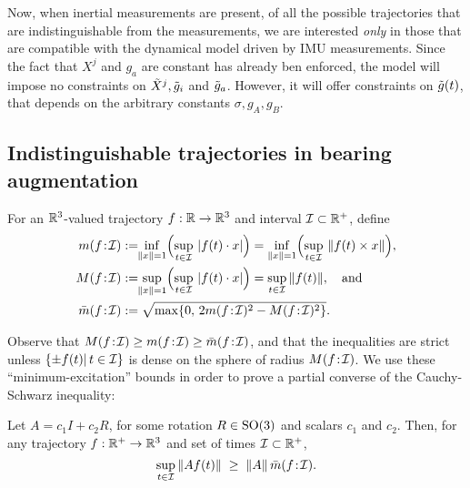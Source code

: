 Now, when inertial measurements are present, of all the possible trajectories that are indistinguishable from the measurements, we are interested {\em only} in those that are compatible with the dynamical model driven by IMU measurements. Since the fact that $X^j$ and $g_a$ are constant has already ben enforced, the model will impose no constraints on $\tilde{X}^j, \tilde{g}_i$ and $\tilde{g}_a$. However, it will offer constraints on $\tilde{g}(t)$, that depends on the arbitrary constants $\sigma, g_A, g_B$. 

\subsection{Indistinguishable trajectories in bearing augmentation}

\begin{defn}
For an $\mathbb{R}^3$-valued trajectory $f:\mathbb{R}\to\mathbb{R}^3$ and interval $\mathcal{I}\subset\mathbb{R}^+$, define
\begin{align*}
\m(f\!:\!\I)
&:= \!\!\inf_{\|x\|=1}\Bigl(\sup_{t\in \I}\,|{f}(t)\cdot x|\Bigr)
= \inf_{\|x\|=1}\Bigl(\sup_{t\in \I}\,\|{f}(t)\times x\|\Bigr),\\
\M(f\!:\!\I)
&:= \!\!\sup_{\|x\|=1}\Bigl(\sup_{t\in\I}\,|{f}(t)\cdot x|\Bigr) = \sup_{t\in\I}\|{f}(t)\|
,
\quad\text{and}\\
\bar\m(f\!:\!\I) &:= \sqrt{\max\{0,\, 2\m(f\!:\!\I)^2 - \M(f\!:\!\I)^2\}}.
\end{align*}
\end{defn}
Observe that ${M}(f\!:\!\mathcal{I}) \geq {m}(f\!:\!\mathcal{I}) \geq \bar{{m}}(f\!:\!\mathcal{I})$, and that the inequalities are strict unless
$\{\pm f(t)|\,t\in\mathcal{I}\}$ is dense on the sphere of radius ${M}(f\!:\!\mathcal{I})$.  We use these ``minimum-excitation''
bounds in order to prove a partial converse of the Cauchy-Schwarz inequality:
\begin{lemma}
Let $A = c_1I + c_2R$, for some rotation $R\in\operatorname{SO}(3)$ and scalars $c_1$ and $c_2$.
Then, for any trajectory $f:\mathbb{R}^+\to\mathbb{R}^3$ and set of times $\mathcal{I}\subset\mathbb{R}^+$,
$$\sup_{t\in \mathcal{I}} \left\|A f(t)\right\| \;\geq\;
\left\|A\right\|\bar{{m}}(f\!:\!\mathcal{I}).
$$
\end{lemma}
